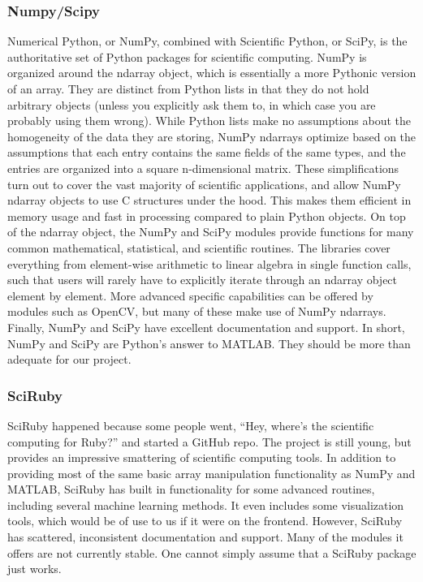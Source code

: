 \subsubsection{Numpy/Scipy}
Numerical Python, or NumPy, combined with Scientific Python, or SciPy, is the authoritative set of Python packages for scientific computing. 
NumPy is organized around the ndarray object, which is essentially a more Pythonic version of an array. 
They are distinct from Python lists in that they do not hold arbitrary objects (unless you explicitly ask them to, in which case you are probably using them wrong). 
While Python lists make no assumptions about the homogeneity of the data they are storing, NumPy ndarrays optimize based on the assumptions that each entry contains the same fields of the same types, and the entries are organized into a square n-dimensional matrix. 
These simplifications turn out to cover the vast majority of scientific applications, and allow NumPy ndarray objects to use C structures under the hood. 
This makes them efficient in memory usage and fast in processing compared to plain Python objects. 
On top of the ndarray object, the NumPy and SciPy modules provide functions for many common mathematical, statistical, and scientific routines. 
The libraries cover everything from element-wise arithmetic to linear algebra in single function calls, such that users will rarely have to explicitly iterate through an ndarray object element by element. 
More advanced specific capabilities can be offered by modules such as OpenCV, but many of these make use of NumPy ndarrays. 
Finally, NumPy and SciPy have excellent documentation and support. 
In short, NumPy and SciPy are Python’s answer to MATLAB. 
They should be more than adequate for our project.

\subsubsection{SciRuby}
SciRuby happened because some people went, “Hey, where’s the scientific computing for Ruby?” and started a GitHub repo. 
The project is still young, but provides an impressive smattering of scientific computing tools. 
In addition to providing most of the same basic array manipulation functionality as NumPy and MATLAB, SciRuby has built in functionality for some advanced routines, including several machine learning methods. 
It even includes some visualization tools, which would be of use to us if it were on the frontend. 
However, SciRuby has scattered, inconsistent documentation and support. 
Many of the modules it offers are not currently stable. 
One cannot simply assume that a SciRuby package just works.


